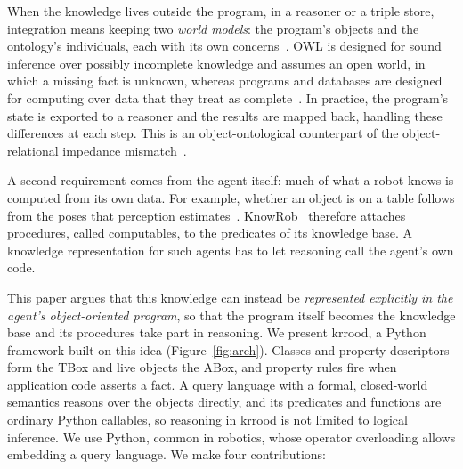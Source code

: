 \documentclass[sigconf,anonymous]{aamas}
\begin{document}
When the knowledge lives outside the program, in a reasoner or a triple store, integration means keeping two \emph{world models}: the program's objects and the ontology's individuals, each with its own concerns~\cite{davis1993knowledge}. OWL is designed for sound inference over possibly incomplete knowledge and assumes an open world, in which a missing fact is unknown, whereas programs and databases are designed for computing over data that they treat as complete~\cite{Reiter1978}. In practice, the program's state is exported to a reasoner and the results are mapped back, handling these differences at each step. This is an object-ontological counterpart of the object-relational impedance mismatch~\cite{ireland2015exposing,ledvinka2020comparison}.

A second requirement comes from the agent itself: much of what a robot knows is computed from its own data. For example, whether an object is on a table follows from the poses that perception estimates~\cite{beetz2018know}. KnowRob~\cite{Tenorth2013,beetz2018know} therefore attaches procedures, called computables, to the predicates of its knowledge base. A knowledge representation for such agents has to let reasoning call the agent's own code.

This paper argues that this knowledge can instead be \emph{represented explicitly in the agent's object-oriented program}, so that the program itself becomes the knowledge base and its procedures take part in reasoning. We present \acf{krrood}, a Python framework built on this idea (Figure~\ref{fig:arch}). Classes and property descriptors form the TBox and live objects the ABox, and property rules fire when application code asserts a fact. A query language with a formal, closed-world semantics reasons over the objects directly, and its predicates and functions are ordinary Python callables, so reasoning in \ac{krrood} is not limited to logical inference. We use Python, common in robotics, whose operator overloading allows embedding a query language. We make four contributions:
\end{document}
